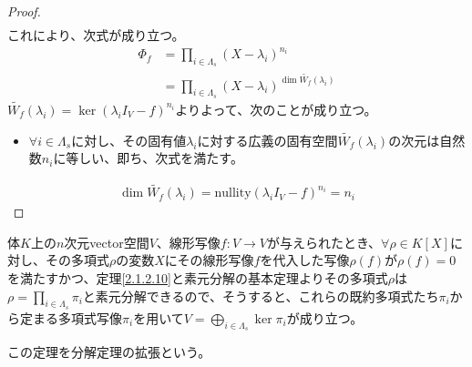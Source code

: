 \documentclass[dvipdfmx]{jsarticle}
\begin{document}
\begin{proof}
\begin{align*}
\end{align*}
これにより、次式が成り立つ。
\begin{align*}
\varPhi_{f} &= \prod_{i \in \varLambda_{s}} \left( X - \lambda_{i} \right)^{n_{i}}\\
&= \prod_{i \in \varLambda_{s}} \left( X - \lambda_{i} \right)^{\dim{\widetilde{W_{f}}\left( \lambda_{i} \right)}}
\end{align*}
$\widetilde{W_{f}}\left( \lambda_{i} \right) = \ker\left( \lambda_{i}I_{V} - f \right)^{n_{i}}$よりよって、次のことが成り立つ。
\begin{itemize}
\item
  $\forall i \in \varLambda_{s}$に対し、その固有値$\lambda_{i}$に対する広義の固有空間$\widetilde{W_{f}}\left( \lambda_{i} \right)$の次元は自然数$n_{i}$に等しい、即ち、次式を満たす。
\end{itemize}
\begin{align*}
\dim{\widetilde{W_{f}}\left( \lambda_{i} \right)} = {\mathrm{nullity}}\left( \lambda_{i}I_{V} - f \right)^{n_{i}} = n_{i}
\end{align*}
\end{proof}
\begin{thm}[分解定理の拡張]
\label{2.2.4.14}
体$K$上の$n$次元vector空間$V$、線形写像$f:V \rightarrow V$が与えられたとき、$\forall\rho \in K[ X]$に対し、その多項式$\rho$の変数$X$にその線形写像$f$を代入した写像$\rho(f)$が$\rho(f) = 0$を満たすかつ、定理\ref{2.1.2.10}と素元分解の基本定理よりその多項式$\rho$は$\rho = \prod_{i \in \varLambda_{s}} {\pi_{i}}$と素元分解できるので、そうすると、これらの既約多項式たち$\pi_{i}$から定まる多項式写像$\pi_{i}$を用いて$V = \bigoplus_{i \in \varLambda_{s}} {\ker\pi_{i}}$が成り立つ。\par
この定理を分解定理の拡張という。
\end{thm}
\end{document}
